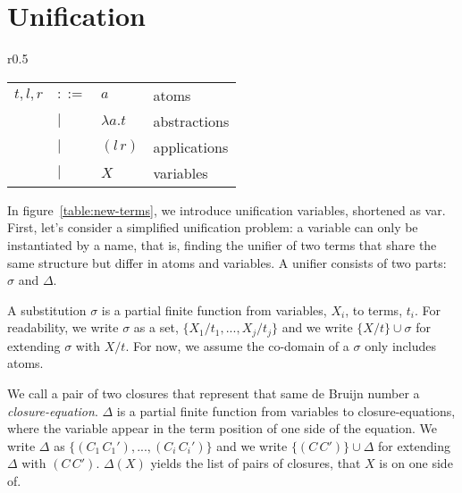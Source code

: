 \documentclass[a4paper,UKenglish]{lipics-v2016}
\newcommand{\app}[2] {
  (#1\, #2)
}
\newcommand{\pr}[2] {
 (#1\, #2)
}
\newcommand{\bd}[2] {
 #1/ #2
}
\begin{document}
\section{Unification}
\label{unify}
\begin{wrapfigure}{r}{0.5\textwidth}
  \caption{Unification terms\label{table:new-terms}}
    \begin{tabular}{r l l l}  
    $t,l,r$ & $::=$ & $a$ & atoms \\
    & $|$ & $\lambda a.t$ & abstractions \\
    & $|$ & $\app{l}{r}$ & applications \\
    & $|$ & $X$ & variables \\
    \end{tabular}
\end{wrapfigure}
In figure~\ref{table:new-terms}, we introduce unification variables, shortened as var.
First, let's consider a simplified unification problem:
a variable can only be instantiated by a name,
that is, finding the unifier of two terms
that share the same structure but differ in atoms and variables.
A unifier consists of two parts: $\sigma$ and $\Delta$.
\begin{definition}
  A substitution $\sigma$ is a partial finite function from variables, $X_i$, to terms, $t_i$.
  For readability, we write $\sigma$ as a set, $\{\bd{X_1}{t_1}, ..., \bd{X_j}{t_j}\}$
  and we write $\{\bd{X}{t}\} \cup \sigma$ for extending $\sigma$ with $\bd{X}{t}$.
  For now, we assume the co-domain of a $\sigma$ only includes atoms.
\end{definition}

\begin{definition}
  We call a pair of two closures that represent that same de Bruijn number
  a \emph{closure-equation}.
  $\Delta$ is a partial finite function from variables to closure-equations,
  where the variable appear in the term position of one side of the equation.
  We write $\Delta$ as $\{\pr{C_1}{C_1'}, ..., \pr{C_i}{C_i'}\}$ and
  we write $\{\pr{C}{C'}\}\cup\Delta$ for extending $\Delta$ with $\pr{C}{C'}$.
  $\Delta(X)$ yields the list of pairs of closures, that $X$ is on one side of.
\end{definition}
\end{document}
